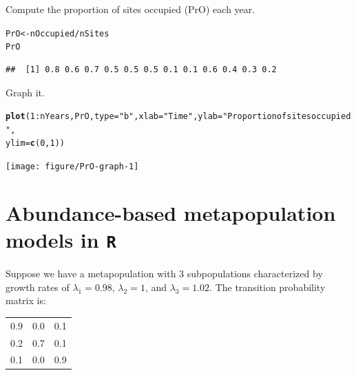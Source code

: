 \documentclass[12pt]{article}\usepackage[]{graphicx}\usepackage[]{xcolor}
\makeatletter
\newcommand{\hlnum}[1]{\textcolor[rgb]{0.686,0.059,0.569}{#1}}%
\newcommand{\hlsng}[1]{\textcolor[rgb]{0.192,0.494,0.8}{#1}}%
\newcommand{\hlopt}[1]{\textcolor[rgb]{0,0,0}{#1}}%
\newcommand{\hldef}[1]{\textcolor[rgb]{0.345,0.345,0.345}{#1}}%
\newcommand{\hlkwb}[1]{\textcolor[rgb]{0.69,0.353,0.396}{#1}}%
\newcommand{\hlkwc}[1]{\textcolor[rgb]{0.333,0.667,0.333}{#1}}%
\newcommand{\hlkwd}[1]{\textcolor[rgb]{0.737,0.353,0.396}{\textbf{#1}}}%
\newenvironment{kframe}{%
 \def\at@end@of@kframe{}%
 \ifinner\ifhmode%
  \def\at@end@of@kframe{\end{minipage}}%
  \begin{minipage}{\columnwidth}%
 \fi\fi%
 \def\FrameCommand##1{\hskip\@totalleftmargin \hskip-\fboxsep
 \colorbox{shadecolor}{##1}\hskip-\fboxsep
     \hskip-\linewidth \hskip-\@totalleftmargin \hskip\columnwidth}%
 \MakeFramed {\advance\hsize-\width
   \@totalleftmargin\z@ \linewidth\hsize
   \@setminipage}}%
 {\par\unskip\endMakeFramed%
 \at@end@of@kframe}
\newenvironment{knitrout}{}{} %
\makeatother
\begin{document}
\clearpage

Compute the proportion of sites occupied (PrO) each year.
\begin{knitrout}
\color{fgcolor}\begin{kframe}
\begin{alltt}
\hldef{PrO} \hlkwb{<-} \hldef{nOccupied} \hlopt{/} \hldef{nSites}
\hldef{PrO}
\end{alltt}
\begin{verbatim}
##  [1] 0.8 0.6 0.7 0.5 0.5 0.5 0.1 0.1 0.6 0.4 0.3 0.2
\end{verbatim}
\end{kframe}
\end{knitrout}

Graph it.
\begin{knitrout}
\color{fgcolor}\begin{kframe}
\begin{alltt}
\hlkwd{plot}\hldef{(}\hlnum{1}\hlopt{:}\hldef{nYears, PrO,} \hlkwc{type}\hldef{=}\hlsng{"b"}\hldef{,} \hlkwc{xlab}\hldef{=}\hlsng{"Time"}\hldef{,} \hlkwc{ylab}\hldef{=}\hlsng{"Proportion of sites occupied"}\hldef{,}
     \hlkwc{ylim}\hldef{=}\hlkwd{c}\hldef{(}\hlnum{0}\hldef{,} \hlnum{1}\hldef{))}
\end{alltt}
\end{kframe}
\texttt{[image: figure/PrO-graph-1]} 
\end{knitrout}


\clearpage

\section*{Abundance-based metapopulation models in \texttt{R}}

Suppose we have a metapopulation with 3 subpopulations characterized
by growth rates of $\lambda_1=0.98$, $\lambda_2=1$, and
$\lambda_3=1.02$. The transition probability matrix is:

\begin{table}[h!]
  \centering
  \begin{tabular}{ccc}
    \hline
    0.9 & 0.0 & 0.1 \\
    0.2 & 0.7 & 0.1 \\
    0.1 & 0.0 & 0.9 \\
    \hline
  \end{tabular}
\end{table}
\end{document}
